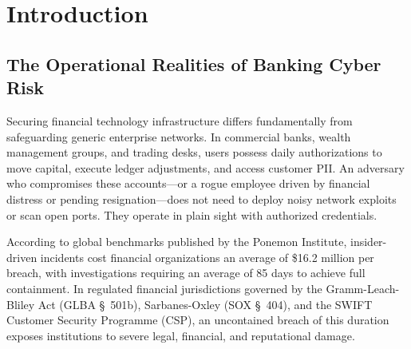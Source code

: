 \documentclass[conference]{IEEEtran}
\begin{document}
\section{Introduction}

\subsection{The Operational Realities of Banking Cyber Risk}
Securing financial technology infrastructure differs fundamentally from safeguarding generic enterprise networks. In commercial banks, wealth management groups, and trading desks, users possess daily authorizations to move capital, execute ledger adjustments, and access customer PII. An adversary who compromises these accounts---or a rogue employee driven by financial distress or pending resignation---does not need to deploy noisy network exploits or scan open ports. They operate in plain sight with authorized credentials.

According to global benchmarks published by the Ponemon Institute, insider-driven incidents cost financial organizations an average of \$16.2 million per breach, with investigations requiring an average of 85 days to achieve full containment. In regulated financial jurisdictions governed by the Gramm-Leach-Bliley Act (GLBA \S~501b), Sarbanes-Oxley (SOX \S~404), and the SWIFT Customer Security Programme (CSP), an uncontained breach of this duration exposes institutions to severe legal, financial, and reputational damage.
\end{document}
